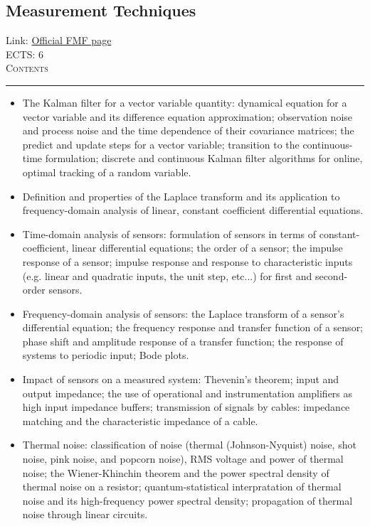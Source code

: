 \documentclass[11pt, a4paper]{article}
\newenvironment{course}[3]{
\subsection{#1}%
Link: \href{#2}{Official FMF page}\\%
ECTS: #3%
\vspace{1ex}
\\
{\large \textsc{Contents}}\\[-0.9ex]%
\rule{\textwidth}{0.5pt}
\vspace{-3ex}
}
{}
\newenvironment{chapter}[1]{
\begin{tcolorbox}[title=#1, breakable]
}
{\end{tcolorbox}}
\begin{document}
\begin{course}{Measurement Techniques}{https://www.fmf.uni-lj.si/en/study-physics/programmes/1fiz/2020/7000777/courses/1441/}{6}
\begin{chapter}{The Kalman filter}
\begin{itemize}
            \item The Kalman filter for a vector variable quantity: dynamical equation for a vector variable and its difference equation approximation; observation noise and process noise and the time dependence of their covariance matrices; the predict and update steps for a vector variable; transition to the continuous-time formulation; discrete and continuous Kalman filter algorithms for online, optimal tracking of a random variable. 
        
        \end{itemize}
    \end{chapter}

    \begin{chapter}{Analysis of sensors and filters}
        \begin{itemize}
        
            \item Definition and properties of the Laplace transform and its application to frequency-domain analysis of linear, constant coefficient differential equations.

            \item Time-domain analysis of sensors: formulation of sensors in terms of constant-coefficient, linear differential equations; the order of a sensor; the impulse response of a sensor; impulse response and response to characteristic inputs (e.g. linear and quadratic inputs, the unit step, etc...) for first and second-order sensors.

            \item Frequency-domain analysis of sensors: the Laplace transform of a sensor's differential equation; the frequency response and transfer function of a sensor; phase shift and amplitude response of a transfer function; the response of systems to periodic input; Bode plots.

            \item Impact of sensors on a measured system: Thevenin's theorem; input and output impedance; the use of operational and instrumentation amplifiers as high input impedance buffers; transmission of signals by cables: impedance matching and the characteristic impedance of a cable.

            \item Thermal noise: classification of noise (thermal (Johnson-Nyquist) noise, shot noise, pink noise, and popcorn noise), RMS voltage and power of thermal noise; the Wiener-Khinchin theorem and the power spectral density of thermal noise on a resistor; quantum-statistical interpratation of thermal noise and its high-frequency power spectral density; propagation of thermal noise through linear circuits.
        

\end{itemize}
\end{chapter}
\end{course}
\end{document}
